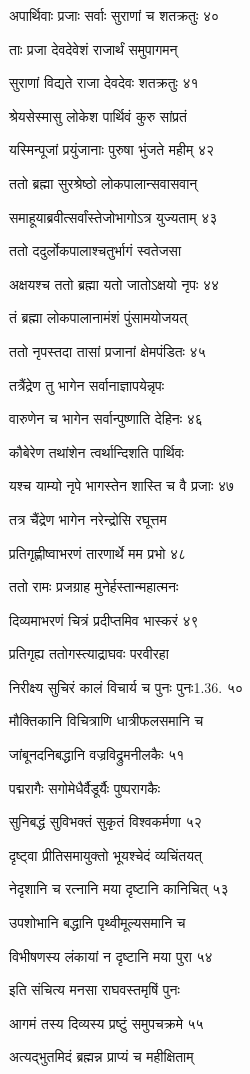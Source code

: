 अपार्थिवाः प्रजाः सर्वाः सुराणां च शतक्रतुः ४०

ताः प्रजा देवदेवेशं राजार्थं समुपागमन्

सुराणां विद्यते राजा देवदेवः शतक्रतुः ४१

श्रेयसेस्मासु लोकेश पार्थिवं कुरु सांप्रतं

यस्मिन्पूजां प्रयुंजानाः पुरुषा भुंजते महीम् ४२

ततो ब्रह्मा सुरश्रेष्ठो लोकपालान्सवासवान्

समाहूयाब्रवीत्सर्वांस्तेजोभागोऽत्र युज्यताम् ४३

ततो ददुर्लोकपालाश्चतुर्भागं स्वतेजसा

अक्षयश्च ततो ब्रह्मा यतो जातोऽक्षयो नृपः ४४

तं ब्रह्मा लोकपालानामंशं पुंसामयोजयत्

ततो नृपस्तदा तासां प्रजानां क्षेमपंडितः ४५

तत्रैंद्रेण तु भागेन सर्वानाज्ञापयेन्नृपः

वारुणेन च भागेन सर्वान्पुष्णाति देहिनः ४६

कौबेरेण तथांशेन त्वर्थान्दिशति पार्थिवः

यश्च याम्यो नृपे भागस्तेन शास्ति च वै प्रजाः ४७

तत्र चैंद्रेण भागेन नरेन्द्रोसि रघूत्तम

प्रतिगृह्णीष्वाभरणं तारणार्थे मम प्रभो ४८

ततो रामः प्रजग्राह मुनेर्हस्तान्महात्मनः

दिव्यमाभरणं चित्रं प्रदीप्तमिव भास्करं ४९

प्रतिगृह्य ततोगस्त्याद्राघवः परवीरहा

निरीक्ष्य सुचिरं कालं विचार्य च पुनः पुनः1.36. ५०

मौक्तिकानि विचित्राणि धात्रीफलसमानि च

जांबूनदनिबद्धानि वज्रविद्रुमनीलकैः ५१

पद्मरागैः सगोमेधैर्वैडूर्यैः पुष्परागकैः

सुनिबद्धं सुविभक्तं सुकृतं विश्वकर्मणा ५२

दृष्ट्वा प्रीतिसमायुक्तो भूयश्चेदं व्यचिंतयत्

नेदृशानि च रत्नानि मया दृष्टानि कानिचित् ५३

उपशोभानि बद्धानि पृथ्वीमूल्यसमानि च

विभीषणस्य लंकायां न दृष्टानि मया पुरा ५४

इति संचित्य मनसा राघवस्तमृषिं पुनः

आगमं तस्य दिव्यस्य प्रष्टुं समुपचक्रमे ५५

अत्यद्भुतमिदं ब्रह्मन्न प्राप्यं च महीक्षिताम्

